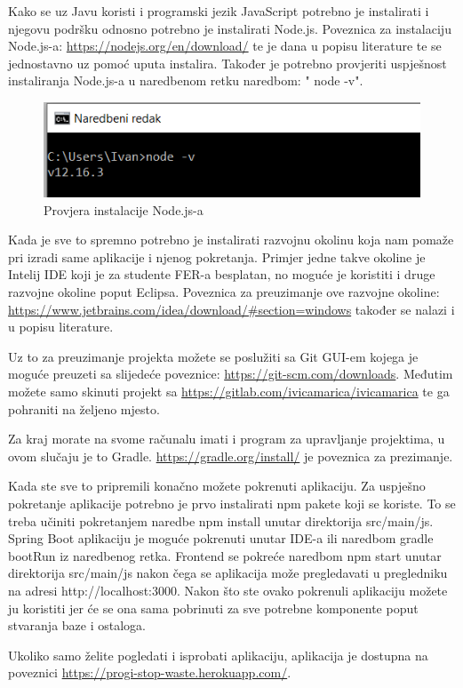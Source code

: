 			Kako se uz Javu koristi i programski jezik JavaScript potrebno je instalirati i njegovu podršku odnosno potrebno je instalirati Node.js. Poveznica za instalaciju Node.js-a: \url{https://nodejs.org/en/download/} te je dana u popisu literature te se jednostavno uz pomoć uputa instalira. Također je potrebno provjeriti uspješnost instaliranja Node.js-a u naredbenom retku naredbom: " node -v".
			
			\begin{figure}[H]
				\includegraphics[scale=0.6]{slike/node.PNG} %
				\centering
				\caption{Provjera instalacije Node.js-a}
				\label{fig:node}
			\end{figure}
		
		Kada je sve to spremno potrebno je instalirati razvojnu okolinu koja nam pomaže pri izradi same aplikacije i njenog pokretanja. Primjer jedne takve okoline je Intelij IDE koji je za studente FER-a besplatan, no moguće je koristiti i druge razvojne okoline poput Eclipsa. Poveznica za preuzimanje ove razvojne okoline:  \url{https://www.jetbrains.com/idea/download/#section=windows}  također se nalazi i u popisu literature.
		
		Uz to za preuzimanje projekta možete se poslužiti sa Git GUI-em kojega je moguće preuzeti sa slijedeće poveznice: \url{https://git-scm.com/downloads}. Međutim možete samo skinuti projekt sa \url{https://gitlab.com/ivicamarica/ivicamarica} te ga pohraniti na željeno mjesto.
		
		Za kraj morate na svome računalu imati i program za upravljanje projektima, u ovom slučaju je to Gradle. \url{https://gradle.org/install/} je poveznica za prezimanje.
		
		Kada ste sve to pripremili konačno možete pokrenuti aplikaciju. Za uspješno pokretanje aplikacije potrebno je prvo instalirati npm pakete koji se koriste. To se treba učiniti pokretanjem naredbe
		npm install unutar direktorija src/main/js.
		Spring Boot aplikaciju je moguće pokrenuti unutar IDE-a ili naredbom gradle bootRun iz naredbenog retka.
		Frontend se pokreće naredbom npm start unutar direktorija src/main/js nakon čega se aplikacija može pregledavati u pregledniku na adresi http://localhost:3000.
		Nakon što ste ovako pokrenuli aplikaciju možete ju koristiti jer će se ona sama pobrinuti za sve potrebne komponente poput stvaranja baze i ostaloga.
		
		Ukoliko samo želite pogledati i isprobati aplikaciju, aplikacija je dostupna na poveznici  \url{https://progi-stop-waste.herokuapp.com/}.
		
		
		
		
			 
			
			\eject 